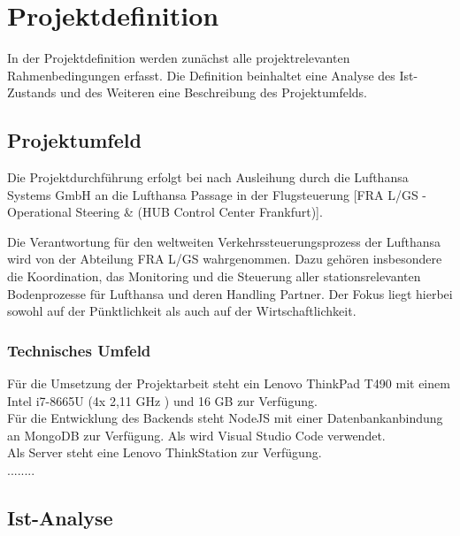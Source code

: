 \section{Projektdefinition}
	In der Projektdefinition werden zunächst alle projektrelevanten Rahmenbedingungen erfasst.
	Die Definition beinhaltet eine Analyse des Ist-Zustands und des Weiteren eine Beschreibung
	des Projektumfelds.

	\subsection{Projektumfeld}

		
		
		Die Projektdurchführung erfolgt bei nach Ausleihung durch die Lufthansa Systems GmbH an die Lufthansa Passage in der Flugsteuerung [FRA L/GS - Operational Steering \&  (HUB Control Center Frankfurt)].

		{
			\noindent
			Die Verantwortung für den weltweiten Verkehrssteuerungsprozess der Lufthansa wird von der
			Abteilung FRA L/GS wahrgenommen. Dazu gehören insbesondere die Koordination, das
			Monitoring und die Steuerung aller stationsrelevanten Bodenprozesse für Lufthansa und deren
			Handling Partner. Der Fokus liegt hierbei sowohl auf der Pünktlichkeit als auch auf der
			Wirtschaftlichkeit.
		}

		\subsubsection{Technisches Umfeld}
		
		Für die Umsetzung der Projektarbeit steht ein Lenovo ThinkPad T490 mit einem Intel i7-8665U (4x 2,11 GHz ) und 16 GB   zur Verfügung.\\
		Für die Entwicklung des Backends steht NodeJS mit einer Datenbankanbindung an MongoDB zur Verfügung. Als  wird Visual Studio Code verwendet.
		\\
		
		Als Server steht eine Lenovo ThinkStation zur Verfügung.\\
	........
	\newpage

		\subsection{Ist-Analyse}

